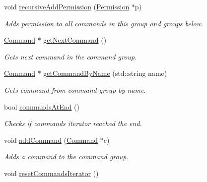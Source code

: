 \begin{DoxyCompactItemize}
void \hyperlink{class_r_c_f_1_1_server_1_1_command_group_a29a13272a4e81871ef4411d3d5e6a6d4}{recursive\+Add\+Permission} (\hyperlink{class_r_c_f_1_1_server_1_1_permission}{Permission} $\ast$p)
\begin{DoxyCompactList}\small\item\em Adds permission to all commands in this group and groups below. \end{DoxyCompactList}\item 
\hyperlink{class_r_c_f_1_1_server_1_1_command}{Command} $\ast$ \hyperlink{class_r_c_f_1_1_server_1_1_command_group_ae1ae69b64a21c6948c378b00656389b9}{get\+Next\+Command} ()
\begin{DoxyCompactList}\small\item\em Gets next command in the command group. \end{DoxyCompactList}\item 
\hyperlink{class_r_c_f_1_1_server_1_1_command}{Command} $\ast$ \hyperlink{class_r_c_f_1_1_server_1_1_command_group_a46dc930697545cc1c4f1e18c1d50046d}{get\+Command\+By\+Name} (std\+::string name)
\begin{DoxyCompactList}\small\item\em Gets command from command group by name. \end{DoxyCompactList}\item 
bool \hyperlink{class_r_c_f_1_1_server_1_1_command_group_a0a1c68d8250edeb73e69d1069a7c07b9}{commands\+At\+End} ()
\begin{DoxyCompactList}\small\item\em Checks if commands iterator reached the end. \end{DoxyCompactList}\item 
void \hyperlink{class_r_c_f_1_1_server_1_1_command_group_a269abb1020ce38953c278b7c80ea11a7}{add\+Command} (\hyperlink{class_r_c_f_1_1_server_1_1_command}{Command} $\ast$c)
\begin{DoxyCompactList}\small\item\em Adds a command to the command group. \end{DoxyCompactList}\item 
\hypertarget{class_r_c_f_1_1_server_1_1_command_group_a891ad2243e2755104ef055204784b6e7}{}void \hyperlink{class_r_c_f_1_1_server_1_1_command_group_a891ad2243e2755104ef055204784b6e7}{reset\+Commands\+Iterator} ()\label{class_r_c_f_1_1_server_1_1_command_group_a891ad2243e2755104ef055204784b6e7}


\end{DoxyCompactItemize}
